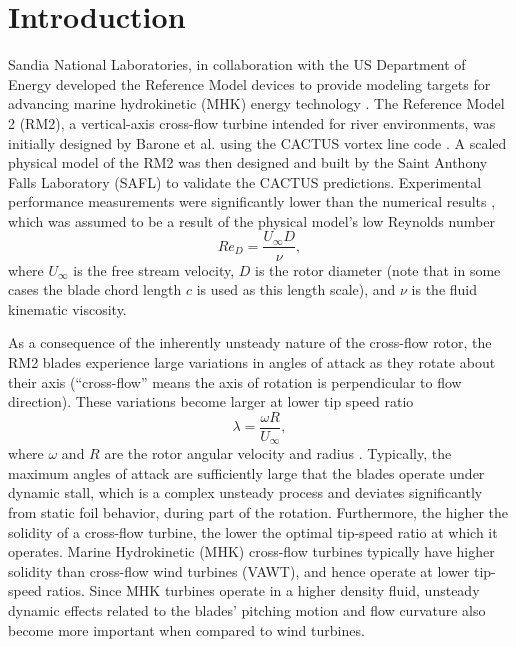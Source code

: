 \documentclass[10pt,letterpaper]{article}
\begin{document}
\linenumbers

\section*{Introduction}

Sandia National Laboratories, in collaboration with the US Department of Energy
developed the Reference Model devices to provide modeling targets for advancing
marine hydrokinetic (MHK) energy technology \cite{Neary2014}. The Reference
Model 2 (RM2), a vertical-axis cross-flow turbine intended for river
environments, was initially designed by Barone et al. \cite{Barone2011} using
the CACTUS vortex line code \cite{Murray2011}. A scaled physical model of the
RM2 was then designed and built by the Saint Anthony Falls Laboratory (SAFL) to
validate the CACTUS predictions. Experimental performance measurements were
significantly lower than the numerical results \cite{Hill2014}, which was
assumed to be a result of the physical model's low Reynolds number
\begin{equation}
    Re_D = \frac{U_\infty D}{\nu},
\label{eq:Re}
\end{equation}
where $U_\infty$ is the free stream velocity, $D$ is the rotor diameter (note
that in some cases the blade chord length $c$ is used as this length scale), and
$\nu$ is the fluid kinematic viscosity.

As a consequence of the inherently unsteady nature of the cross-flow rotor, the
RM2 blades experience large variations in angles of attack as they rotate about
their axis (``cross-flow'' means the axis of rotation is perpendicular to flow
direction). These variations become larger at lower tip speed ratio
\begin{equation}
    \lambda=\frac{\omega R}{U_\infty},
\end{equation}
where $\omega$ and $R$ are the rotor angular velocity and radius
\cite{Para2002}. Typically, the maximum angles of attack are sufficiently large
that the blades operate under dynamic stall, which is a complex unsteady process
and deviates significantly from static foil behavior, during part of the
rotation. Furthermore, the higher the solidity of a cross-flow turbine, the
lower the optimal tip-speed ratio at which it operates. Marine Hydrokinetic
(MHK) cross-flow turbines typically have higher solidity than cross-flow wind
turbines (VAWT), and hence operate at lower tip-speed ratios. Since MHK turbines
operate in a higher density fluid, unsteady dynamic effects related to the
blades' pitching motion and flow curvature also become more important when
compared to wind turbines.
\end{document}
